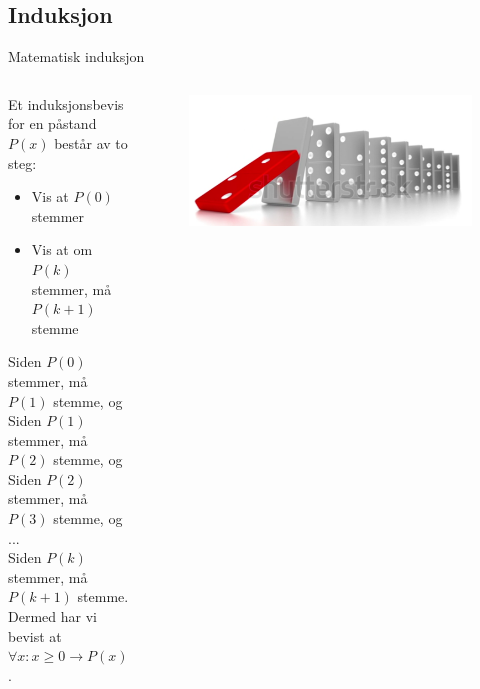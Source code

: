 \subsection{Induksjon}
\begin{frame}{Matematisk induksjon}
    \begin{columns}
        \begin{column}{0.65\textwidth}
            Et induksjonsbevis for en påstand $P(x)$ består av to steg:
            \begin{itemize}
                \item Vis at $P(0)$ stemmer
                \item Vis at om $P(k)$ stemmer, må $P(k+1)$ stemme
            \end{itemize}
        
            \pause
            Siden $P(0)$ stemmer, må $P(1)$ stemme, og\\
            Siden $P(1)$ stemmer, må $P(2)$ stemme, og\\
            Siden $P(2)$ stemmer, må $P(3)$ stemme, og\\
            ...\\
            Siden $P(k)$ stemmer, må $P(k+1)$ stemme.\\[1.5mm]
        
            \pause
            Dermed har vi bevist at $\forall x : x \geq 0 \rightarrow P(x)$.
        \end{column}
        \pause
        \begin{column}{0.25\textwidth}
            \begin{figure}
                \includegraphics[scale=0.1]{images/domino.PNG}
            \end{figure}
        \end{column}
    \end{columns}
\end{frame}

